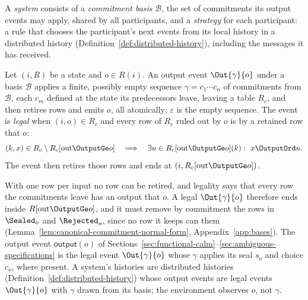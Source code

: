\begin{definition}[System]
\label{def:system}
\label{def:basis}
A \emph{system} consists of a \emph{commitment basis} $\mathcal B$, the set of
commitments its output events may apply, shared by all participants, and a
\emph{strategy} for each participant: a rule that chooses the participant's
next events from its local history in a distributed history
(Definition~\ref{def:distributed-history}), including the messages it has
received.
\end{definition}

\begin{definition}
\label{def:system-output-event}
\label{def:compound-output-event}
Let $(i,R)$ be a state and $o\in R(i)$.  An output event $\Out{\gamma}{o}$
under a basis $\mathcal B$ applies a finite, possibly empty sequence
$\gamma=c_1\cdots c_n$ of commitments from $\mathcal B$, each $c_m$ defined at
the state its predecessors leave, leaving a table $R_c$, and then retires rows
and emits $o$, all atomically; $\varepsilon$ is the empty sequence.  The event
is \emph{legal} when $(i,o)\in R_c$ and every row of $R_c$ ruled out by $o$ is
\outrelpast by a retained row that \outrel $o$:
\begin{equation}
  (k,x)\in R_c\setminus R_c[\mathrm{out}\OutputGe o]
  \quad\Longrightarrow\quad
  \exists u\in R_c[\mathrm{out}\OutputGe o](k):\ x\OutputOrd u.
  \label{eq:lifted-validity}
\end{equation}
The event then retires those \outrelpast rows and ends at
$(i,R_c[\mathrm{out}\OutputGe o])$.
\end{definition}

With one row per input no row can be retired, and legality says that every
row the commitments leave has an output that \outrel $o$.  A legal
$\Out{\gamma}{o}$ therefore ends inside $R[\mathrm{out}\OutputGe o]$, and it
must remove by commitment the rows in $\Sealed_o$ and $\Rejected_o$,
since no row it keeps can \outrelbase them
(Lemma~\ref{lem:canonical-commitment-normal-form}, Appendix~\ref{app:bases}).
The output event $\mathsf{output}(o)$ of
Sections~\ref{sec:functional-calm}--\ref{sec:ambiguous-specifications} is the
legal event $\Out{\gamma}{o}$ whose $\gamma$ applies its seal $s_o$ and choice
$c_o$, where present.  A system's histories are
distributed histories (Definition~\ref{def:distributed-history}) whose output
events are legal events $\Out{\gamma}{o}$ with $\gamma$ drawn from its basis; the
environment observes $o$, not $\gamma$.

